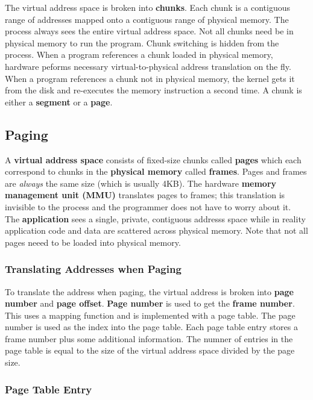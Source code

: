 \documentclass{article}
\newcommand{\bold}[1]{\textbf{#1}}
\begin{document}
The virtual address space is broken into \bold{chunks}. Each chunk is a contiguous range of addresses mapped onto a contiguous range of physical memory. The process always sees the entire virtual address space. Not all chunks need be in physical memory to run the program. Chunk switching is hidden from the process. When a program references a chunk loaded in physical memory, hardware peforms necessary virtual-to-physical address translation on the fly. When a program references a chunk not in physical memory, the kernel gets it from the disk and re-executes the memory instruction a second time. A chunk is either a \bold{segment} or a \bold{page}. \\ 

\subsection{Paging}

A \bold{virtual address space} consists of fixed-size chunks called \bold{pages} which each correspond to chunks in the \bold{physical memory} called \bold{frames}. Pages and frames are \emph{always} the same size (which is usually 4KB). The hardware \bold{memory management unit (MMU)} translates pages to frames; this translation is invisible to the process and the programmer does not have to worry about it. \\ 

The \bold{application} sees a single, private, contiguous addresss space while in reality application code and data are scattered across physical memory. Note that not all pages neeed to be loaded into physical memory. 

\subsubsection{Translating Addresses when Paging}

To translate the address when paging, the virtual address is broken into \bold{page number} and \bold{page offset}. \bold{Page number} is used to get the \bold{frame number}. This uses a mapping function and is implemented with a page table. The page number is used as the index into the page table. Each page table entry stores a frame number plus some additional information. The numner of entries in the page table is equal to the size of the virtual address space divided by the page size. 

\subsubsection{Page Table Entry}
\end{document}
